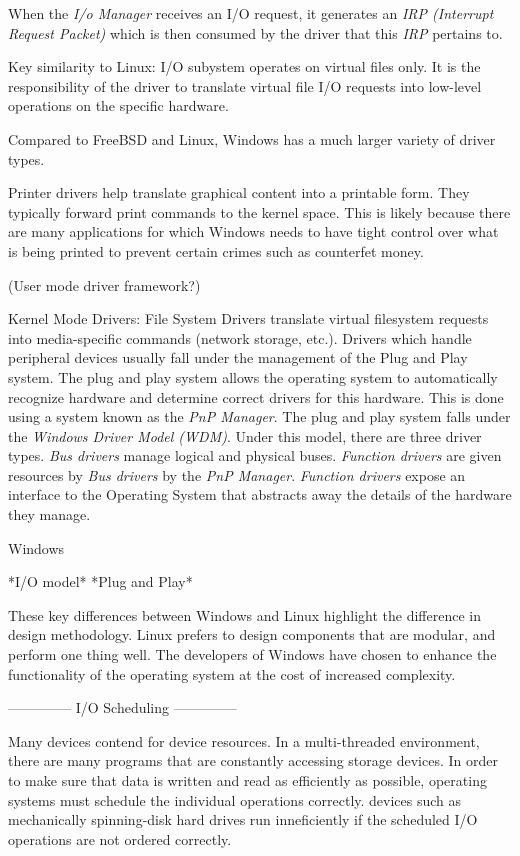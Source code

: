 \documentclass[onecolumn,10pt]{IEEETran}
\begin{document}
  When the \textit{I/o Manager} receives an I/O request, it generates an \textit{IRP (Interrupt Request Packet)} which is then consumed by the driver that this \textit{IRP} pertains to.

  Key similarity to Linux: I/O subystem operates on virtual files only.  It is the responsibility of the driver to translate virtual file I/O requests into low-level operations on the specific hardware.

  Compared to FreeBSD and Linux, Windows has a much larger variety of driver types.
  
  Printer drivers  help translate graphical content into a printable form.  They typically forward print commands to the kernel space.  This is likely because there are many applications for which Windows needs to have tight control over what is being printed to prevent certain crimes such as counterfet money.

  (User mode driver framework?)

  Kernel Mode Drivers:
    File System Drivers translate virtual filesystem requests into media-specific commands (network storage, etc.).
	Drivers which handle peripheral devices usually fall under the management of the Plug and Play system.  The plug and play system allows the operating system to automatically recognize hardware and determine correct drivers for this hardware.  This is done using a system known as the \textit{PnP Manager}.
	The plug and play system falls under the \textit{Windows Driver Model (WDM)}.  Under this model,  there are three driver types.  \textit{Bus drivers} manage logical and physical buses.  \textit{Function drivers} are given resources by \textit{Bus drivers} by the \textit{PnP Manager}.  \textit{Function drivers} expose an interface to the Operating System that abstracts away the details of the hardware they manage.

  Windows 

  *I/O model*
  *Plug and Play*

These key differences between Windows and Linux highlight the difference in design methodology.  Linux prefers to design components that are modular, and perform one thing well.  The developers of Windows have chosen to enhance the functionality of the operating system at the cost of increased complexity.

--------------
I/O Scheduling
--------------

Many devices contend for device resources.  In a multi-threaded environment, there are many programs that are constantly accessing storage devices.  In order to make sure that data is written and read as efficiently as possible, operating systems must schedule the individual operations correctly.  devices such as mechanically spinning-disk hard drives run inneficiently if the scheduled I/O operations are not ordered correctly.
\end{document}
